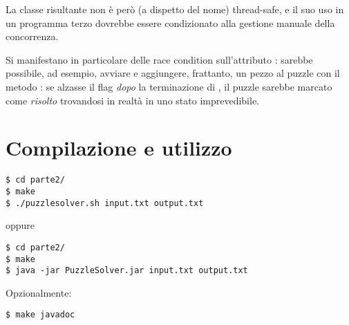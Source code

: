 \documentclass[a4paper]{article}
\begin{document}
La classe risultante non \`e per\`o (a dispetto del nome) thread-safe, e il suo uso in un programma terzo dovrebbe essere condizionato alla gestione manuale della concorrenza.

Si manifestano in particolare delle race condition sull'attributo : sarebbe possibile, ad esempio, avviare  e aggiungere, frattanto, un pezzo al puzzle con il metodo : se  alzasse il flag  \emph{dopo} la terminazione di , il puzzle sarebbe marcato come \emph{risolto} trovandosi in realt\`a in uno stato imprevedibile.

\section{Compilazione e utilizzo}
\begin{verbatim}
$ cd parte2/ 
$ make
$ ./puzzlesolver.sh input.txt output.txt
\end{verbatim}
oppure
\begin{verbatim}
$ cd parte2/ 
$ make
$ java -jar PuzzleSolver.jar input.txt output.txt
\end{verbatim}

Opzionalmente:
\begin{verbatim}
$ make javadoc
\end{verbatim}


{}

\end{document}
